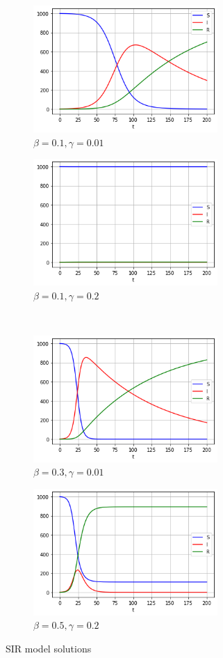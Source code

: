\documentclass{article}
\begin{document}
\begin{figure}[H]
    
    \begin{subfigure}{7cm}
    \centering
    \includegraphics[width=7cm]{0.1&0.01.png}
    \caption{$\beta = 0.1, \gamma = 0.01$}
    \label{fig:my_label}
     \end{subfigure}
     \begin{subfigure}{7cm}
    \centering
    \includegraphics[width=7cm]{0.1&0.2.png}
    \caption{$\beta = 0.1, \gamma = 0.2$}
    \label{fig:my_label}
     \end{subfigure}
     \\
     \begin{subfigure}{7cm}
    \centering
    \includegraphics[width=7cm]{0.3&0.01.png}
    \caption{$\beta = 0.3, \gamma = 0.01$}
    \label{fig:my_label}
     \end{subfigure}
     \begin{subfigure}{7cm}
    \centering
    \includegraphics[width=7cm]{0.5&0.2.png}
    \caption{$\beta = 0.5, \gamma = 0.2$}
    \label{fig:my_label}
     \end{subfigure}
     \caption{SIR model solutions}
\end{figure}
\end{document}
